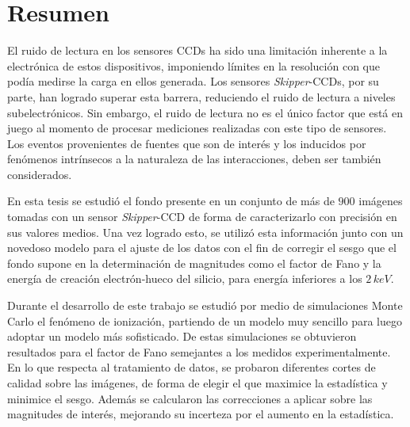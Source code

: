 \newpage
\chapter*{Resumen}
\thispagestyle{empty}
\noindent El ruido de lectura en los sensores CCDs ha sido una limitación inherente a la electrónica de estos dispositivos, imponiendo límites en la resolución con que podía medirse la carga en ellos generada. Los sensores \textit{Skipper}-CCDs, por su parte, han logrado superar esta barrera, reduciendo el ruido de lectura a niveles subelectrónicos.
%
Sin embargo, el ruido de lectura no es el único factor que está en juego al momento de procesar mediciones realizadas con este tipo de sensores. Los eventos provenientes de fuentes que son de interés y los inducidos por fenómenos intrínsecos a la naturaleza de las interacciones, deben ser también considerados.

En esta tesis se estudió el fondo presente en un conjunto de más de $900$ imágenes tomadas con un sensor \textit{Skipper}-CCD de forma de caracterizarlo con precisión en sus valores medios. Una vez logrado esto, se utilizó esta información junto con un novedoso modelo para el ajuste de los datos con el fin de corregir el sesgo que el fondo supone en la determinación de magnitudes como el factor de Fano y la energía de creación electrón-hueco del silicio, para energía inferiores a los $2\,\si{keV}$.

Durante el desarrollo de este trabajo se estudió por medio de simulaciones Monte Carlo el fenómeno de ionización, partiendo de un modelo muy sencillo para luego adoptar un modelo más sofisticado. De estas simulaciones se obtuvieron resultados para el factor de Fano semejantes a los medidos experimentalmente. En lo que respecta al tratamiento de datos, se probaron diferentes cortes de calidad sobre las imágenes, de forma de elegir el que maximice la estadística y minimice el sesgo. Además se calcularon las correcciones a aplicar sobre las magnitudes de interés, mejorando su incerteza por el aumento en la estadística.

